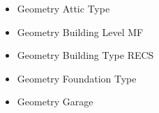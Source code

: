 \begin{itemize}
\item Geometry Attic Type
\item Geometry Building Level MF
\item Geometry Building Type RECS
\item Geometry Foundation Type
\item Geometry Garage
\end{itemize}
